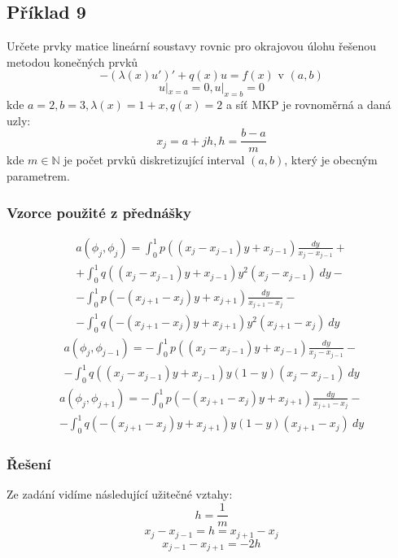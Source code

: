 \documentclass[../main.tex]{subfiles}
\begin{document}
\subsection{Příklad 9}
Určete prvky matice lineární soustavy rovnic pro okrajovou úlohu řešenou\\ metodou konečných prvků
\begin{equation}
    -(\lambda(x)u')' + q(x)u = f(x) \text{ v } (a,b)
\end{equation}
\begin{equation}
    u|_{x=a} = 0, u|_{x=b} = 0
\end{equation}
kde $a=2, b=3, \lambda(x) = 1+x, q(x)=2$ a síť MKP je rovnoměrná a daná uzly:
\begin{equation}
    x_j = a + jh, h=\frac{b-a}{m}
\end{equation}
kde $m\in \mathbb{N}$ je počet prvků diskretizující interval $(a,b)$, který je obecným parametrem.


\subsubsection{Vzorce použité z přednášky}
\begin{multline}\label{pr1:middle}
    a(\phi_j, \phi_j) = \int_0^1 p((x_j - x_{j-1})y + x_{j-1}) \frac{dy}{x_j - x_{j-1}} +\\+ \int_0^1 q((x_j - x_{j-1})y + x_{j-1}) y^2 (x_j - x_{j-1}) \ dy -\\- \int_0^1 p(-(x_{j+1} - x_j)y + x_{j+1}) \frac{dy}{ x_{j+1} - x_j} -\\- \int_0^1 q(-(x_{j+1} - x_j)y + x_{j+1}) y^2 (x_{j+1} - x_j) \ dy
\end{multline}
\begin{multline}\label{pr1:bellow}
    a(\phi_j, \phi_{j-1}) = - \int_0^1 p((x_j - x_{j-1})y + x_{j-1}) \frac{dy}{x_j - x_{j-1}} -\\- \int_0^1 q((x_j - x_{j-1})y + x_{j-1}) y(1-y) (x_j - x_{j-1}) \ dy
\end{multline}
\begin{multline}\label{pr1:above}
    a(\phi_j, \phi_{j+1}) = - \int_0^1 p(-(x_{j+1} - x_j)y + x_{j+1}) \frac{dy}{ x_{j+1} - x_j} -\\- \int_0^1 q(-(x_{j+1} - x_j)y + x_{j+1}) y(1-y) (x_{j+1} - x_j) \ dy
\end{multline}


\subsubsection{Řešení}
Ze zadání vidíme následující užitečné vztahy:
\begin{equation}\label{pr1:vztahhm}
    h=\frac{1}{m}
\end{equation}
\begin{equation}\label{pr1:h}
    x_j - x_{j-1} = h = x_{j+1} - x_j
\end{equation}
\begin{equation}\label{pr1:-2h}
    x_{j-1}- x_{j+1} = -2h
\end{equation}
\end{document}
